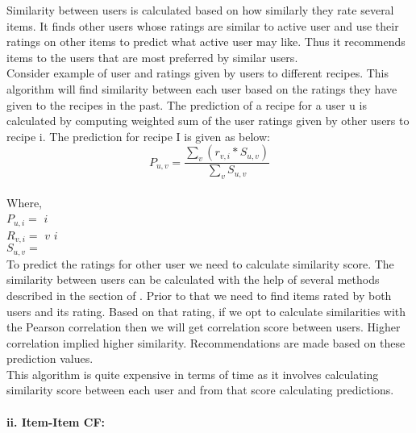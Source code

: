 Similarity between users is calculated based on how similarly they rate several items. It finds other users whose ratings are similar to active user and use their ratings on other items to predict what active user may like. Thus it recommends items to the users that are most preferred by similar users.
\\
Consider example of user and ratings given by users to different recipes. This algorithm will find similarity between each user based on the ratings they have given to the recipes in the past. The prediction of a recipe for a user u is calculated by computing weighted sum of the user ratings given by other users to recipe i.
The prediction for recipe I is given as below:
\\
\begin{equation}
P_{u,v} = \frac { \sum_v(r_{v,i} * S_{u,v})}{\sum_v S_{u,v}}
\end{equation}
\\
Where, 
\\
\noindent
$P_{u,i} = $  $i$ 
\\
$R_{v,i} = $  $v$  $i$ 
\\
$S_{u,v} = $ 
\\

\noindent To predict the ratings for other user we need to calculate similarity score. The similarity between users can be calculated with the help of several methods described in the section of . Prior to that we need to find items rated by both users and its rating. Based on that rating, if we opt to calculate similarities with the Pearson correlation then we will get correlation score between users. Higher correlation implied higher similarity. Recommendations are made based on these prediction values. 
\\
This algorithm is quite expensive in terms of time as it involves calculating similarity score between each user and from that score calculating predictions. 
\\
\noindent \paragraph{ii. Item-Item CF:}

